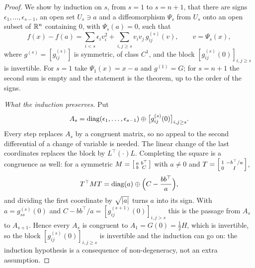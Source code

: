 \begin{notechapter}
\begin{proof}
We show by induction on $s$, from $s = 1$ to $s = n + 1$, that there are
signs $\epsilon_1,\dots,\epsilon_{s-1}$, an open set $U_s\ni a$ and a
diffeomorphism $\Psi_s$ from $U_s$ onto an open subset of $\mathbb{R}^n$
containing $0$, with $\Psi_s(a) = 0$, such that
\begin{equation}\label{inverse-implicit:eq:step}
  f(x) - f(a) = \sum_{i<s}\epsilon_iv_i^2
  + \sum_{i,j\geq s}v_iv_j\,g_{ij}^{(s)}(v) ,
  \qquad v = \Psi_s(x) ,
\end{equation}
where $g^{(s)} = [g^{(s)}_{ij}]$ is symmetric, of class $C^1$, and the
block $[g^{(s)}_{ij}(0)]_{i,j\geq s}$ is invertible. For $s = 1$ take
$\Psi_1(x) = x - a$ and $g^{(1)} = G$; for $s = n + 1$ the second sum is
empty and the statement is the theorem, up to the order of the signs.

\emph{What the induction preserves.} Put
\[
  A_s = \operatorname{diag}(\epsilon_1,\dots,\epsilon_{s-1})
  \oplus\bigl[g^{(s)}_{ij}(0)\bigr]_{i,j\geq s} .
\]
Every step replaces $A_s$ by a congruent matrix, so no appeal to the
second differential of a change of variable is needed. The linear
change of the last coordinates replaces the block by $L^\top(\cdot)L$.
Completing the square is a congruence as well: for a symmetric
$M = \begin{bsmallmatrix}a & b^\top\\ b & C\end{bsmallmatrix}$ with
$a\neq0$ and
$T = \begin{bsmallmatrix}1 & -b^\top/a\\ 0 & I\end{bsmallmatrix}$,
\[
  T^\top MT = \operatorname{diag}(a)\oplus\Bigl(C - \frac{bb^\top}a\Bigr) ,
\]
and dividing the first coordinate by $\sqrt{\left|a\right|}$ turns $a$ into its
sign. With $a = g^{(s)}_{ss}(0)$ and
$C - bb^\top/a = [g^{(s+1)}_{ij}(0)]_{i,j>s}$ this is the passage from
$A_s$ to $A_{s+1}$. Hence every $A_s$ is congruent to
$A_1 = G(0) = \frac12H$, which is invertible, so the block
$[g^{(s)}_{ij}(0)]_{i,j\geq s}$ is invertible and the induction can go
on: the induction hypothesis is a consequence of non-degeneracy, not an
extra assumption.


\end{proof}
\end{notechapter}
